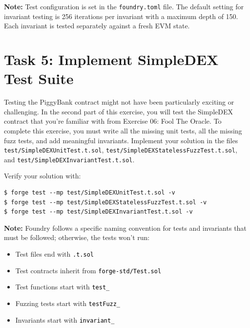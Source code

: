\documentclass[12pt]{article}
\newcommand{\codegrey}[1]{%
  \texttt{\colorbox{black!4}{\textcolor{black}{#1}}}%
}
\begin{document}
\noindent
\textbf{Note:} Test configuration is set in the \texttt{foundry.toml} file. The default setting for invariant testing is 256 iterations per invariant with a maximum depth of 150. Each invariant is tested separately against a fresh EVM state.

\section*{Task 5: Implement SimpleDEX Test Suite}

Testing the PiggyBank contract might not have been particularly exciting or
challenging. In the second part of this exercise, you will test the SimpleDEX
contract that you're familiar with from Exercise 06: Fool The Oracle. To
complete this exercise, you must write all the missing unit tests, all the
missing fuzz tests, and add meaningful invariants. Implement your solution in
the files \texttt{test/SimpleDEXUnitTest.t.sol},
\texttt{test/SimpleDEXStatelessFuzzTest.t.sol}, and
\texttt{test/SimpleDEXInvariantTest.t.sol}.

\medskip
\noindent
Verify your solution with:

\noindent \begin{minipage}{\textwidth}
    \begin{verbatim}
$ forge test --mp test/SimpleDEXUnitTest.t.sol -v
$ forge test --mp test/SimpleDEXStatelessFuzzTest.t.sol -v
$ forge test --mp test/SimpleDEXInvariantTest.t.sol -v
\end{verbatim}
\end{minipage}

\noindent
\textbf{Note:} Foundry follows a specific naming convention for tests and invariants that must be followed; otherwise, the tests won't run:

\begin{itemize}
    \item Test files end with \codegrey{.t.sol}
    \item Test contracts inherit from \codegrey{forge-std/Test.sol}
    \item Test functions start with \codegrey{test\_}
    \item Fuzzing tests start with \codegrey{testFuzz\_}
    \item Invariants start with \codegrey{invariant\_}
\end{itemize}
\end{document}
